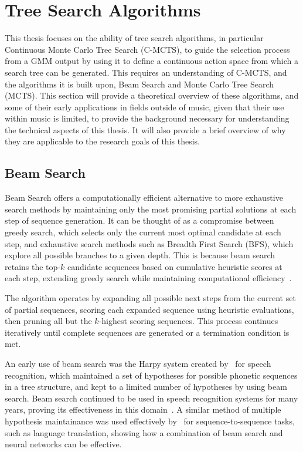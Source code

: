 \section{Tree Search Algorithms}
This thesis focuses on the ability of tree search algorithms, in particular Continuous Monte Carlo Tree Search (C-MCTS), to guide the selection process from a GMM output by using it to define a continuous action space from which a search tree can be generated. This requires an understanding of C-MCTS, and the algorithms it is built upon, Beam Search and Monte Carlo Tree Search (MCTS). This section will provide a theoretical overview of these algorithms, and some of their early applications in fields outside of music, given that their use within music is limited, to provide the background necessary for understanding the technical aspects of this thesis. It will also provide a brief overview of why they are applicable to the research goals of this thesis.

\subsection{Beam Search}
Beam Search offers a computationally efficient alternative to more exhaustive search methods by maintaining only the most promising partial solutions at each step of sequence generation. It can be thought of as a compromise between greedy search, which selects only the current most optimal candidate at each step, and exhaustive search methods such as Breadth First Search (BFS), which explore all possible branches to a given depth. This is because beam search retains the top-$k$ candidate sequences based on cumulative heuristic scores at each step, extending greedy search while maintaining computational efficiency~\citep{Bisiani1992BeamSearch}.

The algorithm operates by expanding all possible next steps from the current set of partial sequences, scoring each expanded sequence using heuristic evaluations, then pruning all but the $k$-highest scoring sequences. This process continues iteratively until complete sequences are generated or a termination condition is met.

An early use of beam search was the Harpy system created by~\cite{Lowerre1976Harpy} for speech recognition, which maintained a set of hypotheses for possible phonetic sequences in a tree structure, and kept to a limited number of hypotheses by using beam search. Beam search continued to be used in speech recognition systems for many years, proving its effectiveness in this domain~\cite{Steinbiss1994BeamNLP}. A similar method of multiple hypothesis maintainance was used effectively by~\cite{Sutskever2014Seq2Seq} for sequence-to-sequence tasks, such as language translation, showing how a combination of beam search and neural networks can be effective.

